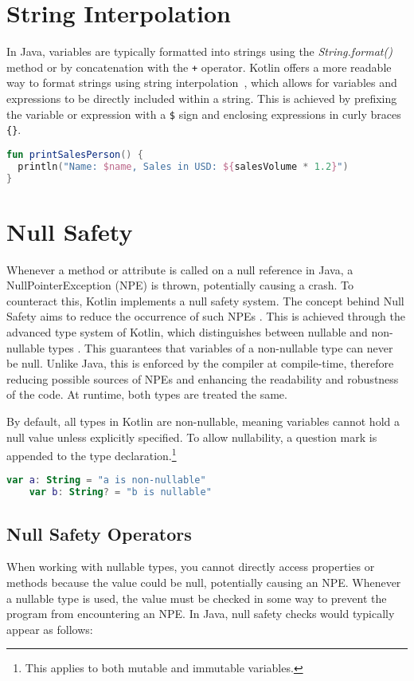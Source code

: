 \documentclass[a4paper, 11pt]{article}
\begin{document}
\section{String Interpolation}
In Java, variables are typically formatted into strings using the \textit{String.format()} method or by concatenation with the \texttt{+} operator.
Kotlin offers a more readable way to format strings using string interpolation~\cite{string-concatenation}, which allows for variables and expressions to be directly included within a string.
This is achieved by prefixing the variable or expression with a \texttt{\$} sign and enclosing expressions in curly braces \texttt{\{\}}.

\begin{lstlisting}[language=Kotlin,title={String Interpolation}]
fun printSalesPerson() {
  println("Name: $name, Sales in USD: ${salesVolume * 1.2}")
}
\end{lstlisting}

\section{Null Safety}
  Whenever a method or attribute is called on a null reference in Java, a NullPointerException (NPE) is thrown, potentially causing a crash. To counteract this, Kotlin implements a null safety system. The concept behind Null Safety aims to reduce the occurrence of such NPEs \cite{nullsafety}. This is achieved through the advanced type system of Kotlin, which distinguishes between nullable and non-nullable types \cite{nullsafety-nullable-types}. This guarantees that variables of a non-nullable type can never be null. Unlike Java, this is enforced by the compiler at compile-time, therefore reducing possible sources of NPEs and enhancing the readability and robustness of the code. At runtime, both types are treated the same.
  
  By default, all types in Kotlin are non-nullable, meaning variables cannot hold a null value unless explicitly specified. To allow nullability, a question mark is appended to the type declaration.\footnote{This applies to both mutable and immutable variables.}

  \begin{lstlisting}[language=Kotlin]
    var a: String = "a is non-nullable"
    var b: String? = "b is nullable"
  \end{lstlisting}
  
\subsection{Null Safety Operators}
When working with nullable types, you cannot directly access properties or methods because the value could be null, potentially causing an NPE. Whenever a nullable type is used, the value must be checked in some way to prevent the program from encountering an NPE.
In Java, null safety checks would typically appear as follows:
\end{document}
